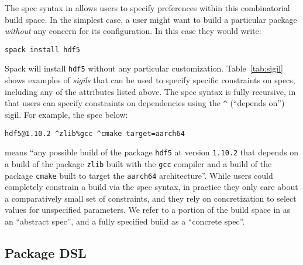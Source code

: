 

The spec syntax in \spack allows users to specify preferences within this combinatorial
build space. In the simplest case, a user might want to build a particular package {\it
  without} any concern for its configuration. In this case they would write:
\begin{verbatim}
spack install hdf5
\end{verbatim}
Spack will install {\tt hdf5} without any particular customization.
Table~\ref{tab:sigil} shows examples of {\it sigils} that can be used to specify
specific constraints on specs, including any of the attributes listed above. The spec
syntax is fully recursive, in that users can specify constraints on dependencies using
the {\tt \^{}} (``depends on'') sigil. For example, the spec below:
\begin{verbatim}
hdf5@1.10.2 ^zlib%gcc ^cmake target=aarch64
\end{verbatim}

means ``any possible build of the package \texttt{hdf5} at version {\tt 1.10.2} that
depends on a build of the package \texttt{zlib} built with the \texttt{gcc} compiler and
a build of the package \texttt{cmake} built to target the \texttt{aarch64}
architecture''. While users could completely constrain a build via the spec syntax, in
practice they only care about a comparatively small set of constraints, and they rely on
concretization to select values for unspecified parameters. We refer to a portion of the
build space in \spack as an ``abstract spec'', and a fully specified build as a
``concrete spec''.

\subsection{Package DSL}
\label{sec:package-dsl}


